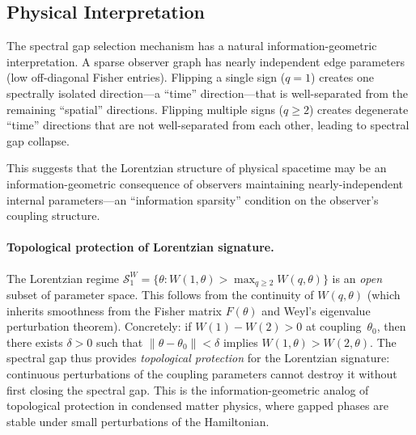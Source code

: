 \documentclass[11pt]{article}
\theoremstyle{definition}
\theoremstyle{remark}
\begin{document}
\subsection{Physical Interpretation}

The spectral gap selection mechanism has a natural information-geometric
interpretation. A sparse observer graph has nearly independent edge
parameters (low off-diagonal Fisher entries). Flipping a single sign
($q = 1$) creates one spectrally isolated direction---a ``time''
direction---that is well-separated from the remaining ``spatial'' directions.
Flipping multiple signs ($q \geq 2$) creates degenerate ``time'' directions
that are not well-separated from each other, leading to spectral gap
collapse.

This suggests that the Lorentzian structure of physical spacetime may be an
information-geometric consequence of observers maintaining
nearly-independent internal parameters---an ``information sparsity''
condition on the observer's coupling structure.

\paragraph{Topological protection of Lorentzian signature.}
The Lorentzian regime $\mathcal{S}_1^W = \{ \theta : W(1, \theta) > \max_{q \geq 2} W(q, \theta) \}$
is an \emph{open} subset of parameter space. This follows from the continuity
of $W(q, \theta)$ (which inherits smoothness from the Fisher matrix $F(\theta)$
and Weyl's eigenvalue perturbation theorem). Concretely: if $W(1) - W(2) > 0$
at coupling~$\theta_0$, then there exists $\delta > 0$ such that
$\|\theta - \theta_0\| < \delta$ implies $W(1, \theta) > W(2, \theta)$.
The spectral gap thus provides \emph{topological protection} for the
Lorentzian signature: continuous perturbations of the coupling parameters
cannot destroy it without first closing the spectral gap. This is the
information-geometric analog of topological protection in condensed matter
physics, where gapped phases are stable under small perturbations of the
Hamiltonian.
\end{document}
